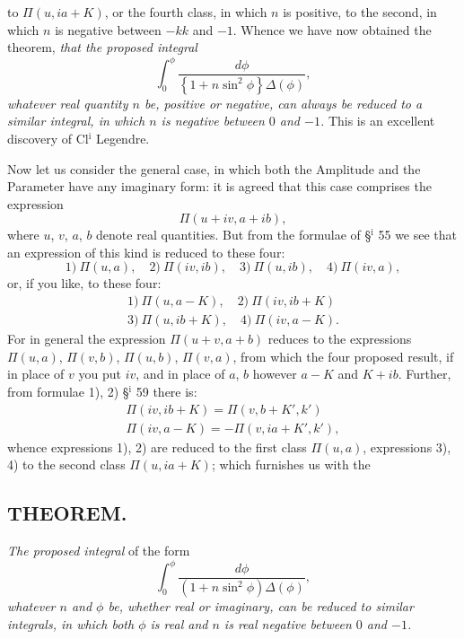 \documentclass{article}
\begin{document}
to $\Pi(u,ia+K)$, or the fourth class, in which $n$ is positive, to the second, in which $n$ is negative between $-kk$ and $-1$. Whence we have now obtained the theorem, \emph{that the proposed integral}
\[
\int_{0}^{\phi}\frac{d\phi}{\left\{1+n\sin^{2}\phi\right\}\Delta(\phi)},
\]
\emph{whatever real quantity $n$ be, positive or negative, can always be reduced to a similar integral, in which $n$ is negative between $0$ and $-1$.} This is an excellent discovery of Cl$^{\mathrm{i}}$ Legendre.

Now let us consider the general case, in which both the Amplitude and the Parameter have any imaginary form: it is agreed that this case comprises the expression
\[
\Pi(u+iv,a+ib),
\]
where $u$, $v$, $a$, $b$ denote real quantities. But from the formulae of §$^{\mathrm{i}}$ 55 we see that an expression of this kind is reduced to these four:
\[
\text{1)}\ \Pi(u,a),\quad\text{2)}\ \Pi(iv,ib),\quad\text{3)}\ \Pi(u,ib),\quad\text{4)}\ \Pi(iv,a),
\]
or, if you like, to these four:
\[
\begin{gathered}
\text{1)}\ \Pi(u,a-K),\quad\text{2)}\ \Pi(iv,ib+K)\\[1ex]
\text{3)}\ \Pi(u,ib+K),\quad\text{4)}\ \Pi(iv,a-K).
\end{gathered}
\]
For in general the expression $\Pi(u+v,a+b)$ reduces to the expressions $\Pi(u,a)$, $\Pi(v,b)$, $\Pi(u,b)$, $\Pi(v,a)$, from which the four proposed result, if in place of $v$ you put $iv$, and in place of $a$, $b$ however $a-K$ and $K+ib$. Further, from formulae 1), 2) §$^{\mathrm{i}}$ 59 there is:
\[
\begin{gathered}
\Pi(iv,ib+K)=\Pi(v,b+K',k')\\[1ex]
\Pi(iv,a-K)=-\Pi(v,ia+K',k'),
\end{gathered}
\]
whence expressions 1), 2) are reduced to the first class  $\Pi(u,a)$, expressions 3), 4) to the second class $\Pi(u,ia+K)$; which furnishes us with the

\subsection*{THEOREM.}

\emph{The proposed integral} of the form
\[
\int_{0}^{\phi}\frac{d\phi}{(1+n\sin^{2}\phi)\Delta(\phi)},
\]
\emph{whatever $n$ and $\phi$ be, whether real or imaginary, can be reduced to similar integrals, in which both $\phi$ is real and $n$ is real negative between $0$ and $-1$.}
\end{document}

